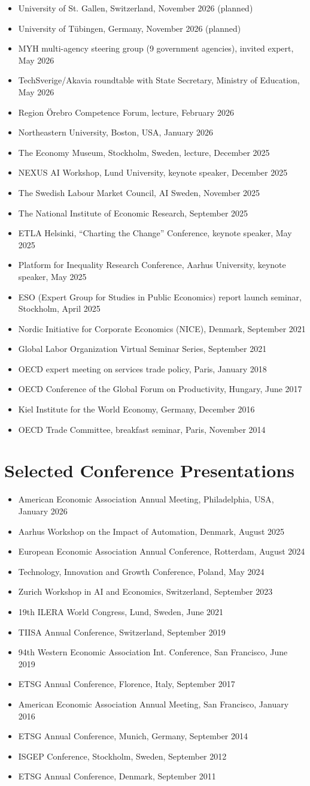 \documentclass[11pt,a4paper]{article}
\newcommand{\cventry}[1]{\item #1}
\begin{document}
\begin{itemize}
 \cventry{University of St. Gallen, Switzerland, November 2026 (planned)}
 \cventry{University of Tübingen, Germany, November 2026 (planned)}
 \cventry{MYH multi-agency steering group (9 government agencies), invited expert, May 2026}
 \cventry{TechSverige/Akavia roundtable with State Secretary, Ministry of Education, May 2026}
 \cventry{Region Örebro Competence Forum, lecture, February 2026}
 \cventry{Northeastern University, Boston, USA, January 2026}
 \cventry{The Economy Museum, Stockholm, Sweden, lecture, December 2025}
 \cventry{NEXUS AI Workshop, Lund University, keynote speaker, December 2025}
 \cventry{The Swedish Labour Market Council, AI Sweden, November 2025}
 \cventry{The National Institute of Economic Research, September 2025}
 \cventry{ETLA Helsinki, ``Charting the Change'' Conference, keynote speaker, May 2025}
 \cventry{Platform for Inequality Research Conference, Aarhus University, keynote speaker, May 2025}
 \cventry{ESO (Expert Group for Studies in Public Economics) report launch seminar, Stockholm, April 2025}
 \cventry{Nordic Initiative for Corporate Economics (NICE), Denmark, September 2021}
 \cventry{Global Labor Organization Virtual Seminar Series, September 2021}
 \cventry{OECD expert meeting on services trade policy, Paris, January 2018}
 \cventry{OECD Conference of the Global Forum on Productivity, Hungary, June 2017}
 \cventry{Kiel Institute for the World Economy, Germany, December 2016}
 \cventry{OECD Trade Committee, breakfast seminar, Paris, November 2014}
\end{itemize}

\section{Selected Conference Presentations}

\begin{itemize}
 \cventry{American Economic Association Annual Meeting, Philadelphia, USA, January 2026}
 \cventry{Aarhus Workshop on the Impact of Automation, Denmark, August 2025}
 \cventry{European Economic Association Annual Conference, Rotterdam, August 2024}
 \cventry{Technology, Innovation and Growth Conference, Poland, May 2024}
 \cventry{Zurich Workshop in AI and Economics, Switzerland, September 2023}
 \cventry{19th ILERA World Congress, Lund, Sweden, June 2021}
 \cventry{TIISA Annual Conference, Switzerland, September 2019}
 \cventry{94th Western Economic Association Int. Conference, San Francisco, June 2019}
 \cventry{ETSG Annual Conference, Florence, Italy, September 2017}
 \cventry{American Economic Association Annual Meeting, San Francisco, January 2016}
 \cventry{ETSG Annual Conference, Munich, Germany, September 2014}
 \cventry{ISGEP Conference, Stockholm, Sweden, September 2012}
 \cventry{ETSG Annual Conference, Denmark, September 2011}
\end{itemize}
\end{document}
